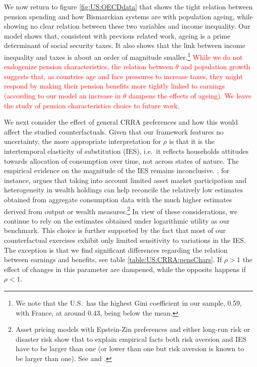 We now return to figure \ref{fig:US:OECDdata} that shows the tight relation between pension spending and how Bismarckian systems are with population ageing, while showing no clear relation between these two variables and income inequality. Our model shows that, consistent with previous related work, ageing is a prime determinant of social security taxes. It also shows that the link between income inequality and taxes is about an order of magnitude smaller.\footnote{We note that the U.S.\ has the highest Gini coefficient in our sample, 0.59, with France, at around 0.43, being below the mean.} \textcolor{red}{While we do not endogenize pension characteristics, the relation between $\theta$ and population growth suggests that, as countries age and face pressures to increase taxes, they might respond by making their pension benefits more tightly linked to earnings (according to our model an increase in $\theta$ dampens the effects of ageing). We leave the study of pension characteristics choice to future work.}


We next consider the effect of general CRRA preferences and how this would affect the studied counterfactuals. Given that our framework features no uncertainty, the more appropriate interpretation for $\rho$ is that it is the intertemporal elasticity of substitution (IES), i.e.\ it reflects households attitudes towards allocation of consumption over time, not across states of nature. The empirical evidence on the magnitude of the IES remains inconclusive. \textcite{Guvenena1}, for instance, argues that taking into account limited asset market participation and heterogeneity in wealth holdings can help reconcile the relatively low estimates obtained from aggregate consumption data with the much higher estimates derived from output or wealth measures.\footnote{Asset pricing models with Epstein-Zin preferences and either long-run risk or disaster risk show that to explain empirical facts both risk aversion and IES have to be larger than one (or lower than one but risk aversion is known to be larger than one). See \textcite{BansalYa1} and \textcite{Barroa1}.} In view of these considerations, we continue to rely on the estimates obtained under logarithmic utility as our benchmark. This choice is further supported by the fact that most of our counterfactual exercises exhibit only limited sensitivity to variations in the IES. The exception is that we find significant differences regarding the relation between earnings and benefits, see table \ref{table:US:CRRA:pensChars}. If $\rho>1$ the effect of changes in this parameter are dampened, while the opposite happens if $\rho<1$.

